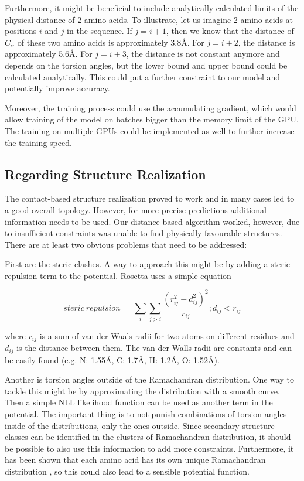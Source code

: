 Furthermore, it might be beneficial to include analytically calculated limits of the physical distance of 2 amino acids.
To illustrate, let us imagine 2 amino acids at positions $i$ and $j$ in the sequence.
If $j = i+1$, then we know that the distance of $C_{\alpha}$ of these two amino acids is approximately 3.8\AA.
For $j = i+2$, the distance is approximately 5.6\AA.
For $j = i+3$, the distance is not constant anymore and depends on the torsion angles, but the lower bound and upper bound could be calculated analytically.
This could put a further constraint to our model and potentially improve accuracy.

Moreover, the training process could use the accumulating gradient, which would allow training of the model on batches bigger than the memory limit of the GPU.
The training on multiple GPUs could be implemented as well to further increase the training speed.

\subsection{Regarding Structure Realization}

The contact-based structure realization proved to work and in many cases led to a good overall topology. However, for more precise predictions additional information needs to be used. Our distance-based algorithm worked, however, due to insufficient constraints was unable to find physically favourable structures. There are at least two obvious problems that need to be addressed:

First are the steric clashes. A way to approach this might be by adding a steric repulsion term to the potential. Rosetta \cite{rosetta} uses a simple equation

$$steric~repulsion~=\sum_{i} \sum_{j > i} \frac{(r_{ij}^2 - d_{ij}^2) ^ 2}{r_{ij}}; d_{ij} < r_{ij}$$

where $r_{ij}$ is a sum of van der Waals radii for two atoms on different residues and $d_{ij}$ is the distance between them. The van der Walls radii are constants and can be easily found (e.g. N: 1.55\AA, C: 1.7\AA, H: 1.2\AA, O: 1.52\AA )\cite{vdw_radii}.

Another is torsion angles outside of the Ramachandran distribution. One way to tackle this might be by approximating the distribution with a smooth curve. Then a simple NLL likelihood function can be used as another term in the potential. The important thing is to not punish combinations of torsion angles inside of the distributions, only the ones outside. 
Since secondary structure classes can be identified in the clusters of Ramachandran distribution, it should be possible to also use this information to add more constraints. Furthermore, it has been shown that each amino acid has its own unique Ramachandran distribution \cite{rama_aa}, so this could also lead to a sensible potential function.